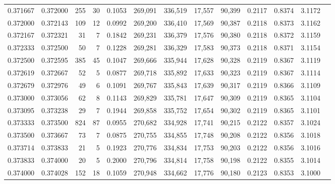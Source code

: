 \begin{tabular}{rrrrrrrrrrrrr}
0.371667 & 0.372000 &   255 &  30 &                                     0.1053 & 269,091 & 336,519 &  17,557 &  90,399 & 0.2117 & 0.8374 & 3.1172 \\
0.372000 & 0.372143 &   109 &  12 &                                     0.0992 & 269,200 & 336,410 &  17,569 &  90,387 & 0.2118 & 0.8373 & 3.1162 \\
0.372167 & 0.372321 &    31 &   7 &                                     0.1842 & 269,231 & 336,379 &  17,576 &  90,380 & 0.2118 & 0.8372 & 3.1159 \\
0.372333 & 0.372500 &    50 &   7 &                                     0.1228 & 269,281 & 336,329 &  17,583 &  90,373 & 0.2118 & 0.8371 & 3.1154 \\
0.372500 & 0.372595 &   385 &  45 &                                     0.1047 & 269,666 & 335,944 &  17,628 &  90,328 & 0.2119 & 0.8367 & 3.1119 \\
0.372619 & 0.372667 &    52 &   5 &                                     0.0877 & 269,718 & 335,892 &  17,633 &  90,323 & 0.2119 & 0.8367 & 3.1114 \\
0.372679 & 0.372976 &    49 &   6 &                                     0.1091 & 269,767 & 335,843 &  17,639 &  90,317 & 0.2119 & 0.8366 & 3.1109 \\
0.373000 & 0.373056 &    62 &   8 &                                     0.1143 & 269,829 & 335,781 &  17,647 &  90,309 & 0.2119 & 0.8365 & 3.1104 \\
0.373095 & 0.373238 &    29 &   7 &                                     0.1944 & 269,858 & 335,752 &  17,654 &  90,302 & 0.2119 & 0.8365 & 3.1101 \\
0.373333 & 0.373500 &   824 &  87 &                                     0.0955 & 270,682 & 334,928 &  17,741 &  90,215 & 0.2122 & 0.8357 & 3.1024 \\
0.373500 & 0.373667 &    73 &   7 &                                     0.0875 & 270,755 & 334,855 &  17,748 &  90,208 & 0.2122 & 0.8356 & 3.1018 \\
0.373714 & 0.373833 &    21 &   5 &                                     0.1923 & 270,776 & 334,834 &  17,753 &  90,203 & 0.2122 & 0.8356 & 3.1016 \\
0.373833 & 0.374000 &    20 &   5 &                                     0.2000 & 270,796 & 334,814 &  17,758 &  90,198 & 0.2122 & 0.8355 & 3.1014 \\
0.374000 & 0.374028 &   152 &  18 &                                     0.1059 & 270,948 & 334,662 &  17,776 &  90,180 & 0.2123 & 0.8353 & 3.1000 \\

\end{tabular}
